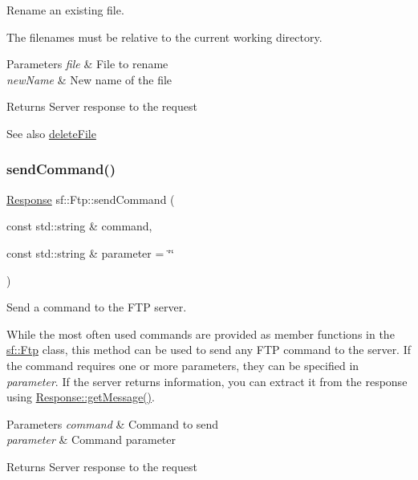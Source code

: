 Rename an existing file. 

The filenames must be relative to the current working directory.


\begin{DoxyParams}{Parameters}
{\em file} & File to rename \\
\hline
{\em new\+Name} & New name of the file\\
\hline
\end{DoxyParams}
\begin{DoxyReturn}{Returns}
Server response to the request
\end{DoxyReturn}
\begin{DoxySeeAlso}{See also}
\hyperlink{classsf_1_1_ftp_a8aa272b0eb7769a850006e70fcad370f}{delete\+File} 
\end{DoxySeeAlso}
\mbox{\label{classsf_1_1_ftp_a44e095103ecbce175a33eaf0820440ff}} 
\subsubsection{\texorpdfstring{send\+Command()}{sendCommand()}}
{\footnotesize\ttfamily \hyperlink{classsf_1_1_ftp_1_1_response}{Response} sf\+::\+Ftp\+::send\+Command (\begin{DoxyParamCaption}\item[{const std\+::string \&}]{command,  }\item[{const std\+::string \&}]{parameter = {\ttfamily \char`\"{}\char`\"{}} }\end{DoxyParamCaption})}



Send a command to the F\+TP server. 

While the most often used commands are provided as member functions in the \hyperlink{classsf_1_1_ftp}{sf\+::\+Ftp} class, this method can be used to send any F\+TP command to the server. If the command requires one or more parameters, they can be specified in {\itshape parameter}. If the server returns information, you can extract it from the response using \hyperlink{classsf_1_1_ftp_1_1_response_a4af82a0b3620c90558390e1f600abc05}{Response\+::get\+Message()}.


\begin{DoxyParams}{Parameters}
{\em command} & Command to send \\
\hline
{\em parameter} & Command parameter\\
\hline
\end{DoxyParams}
\begin{DoxyReturn}{Returns}
Server response to the request 
\end{DoxyReturn}
\mbox{\label{classsf_1_1_ftp_a46d6e15cddd719288b5a08b685e11765}} 

